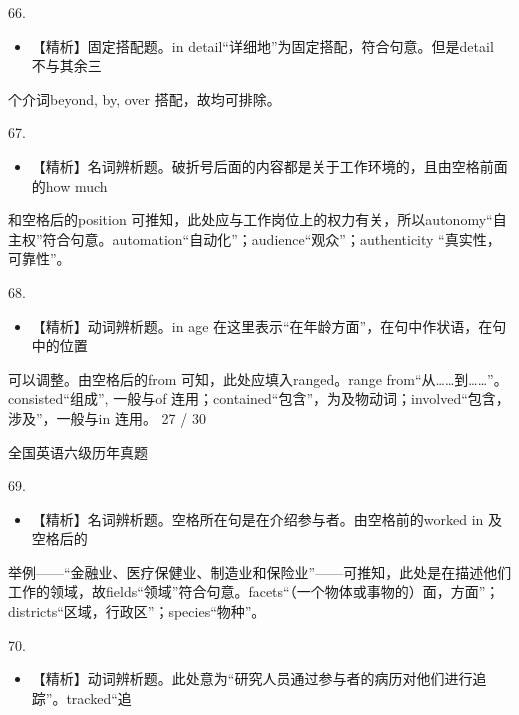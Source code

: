 \documentclass[UTF8,11pt]{ctexart}
\begin{document}
66.


\begin{itemize}[leftmargin=2em,itemsep=.2em,topsep=.4em]\item[B.] 【精析】固定搭配题。in detail“详细地”为固定搭配，符合句意。但是detail 不与其余三
\end{itemize}

个介词beyond, by, over 搭配，故均可排除。


67.


\begin{itemize}[leftmargin=2em,itemsep=.2em,topsep=.4em]\item[A.] 【精析】名词辨析题。破折号后面的内容都是关于工作环境的，且由空格前面的how much
\end{itemize}

和空格后的position 可推知，此处应与工作岗位上的权力有关，所以autonomy“自主权”符合句意。automation“自动化”；audience“观众”；authenticity “真实性，可靠性”。


68.


\begin{itemize}[leftmargin=2em,itemsep=.2em,topsep=.4em]\item[D.] 【精析】动词辨析题。in age 在这里表示“在年龄方面”，在句中作状语，在句中的位置
\end{itemize}

可以调整。由空格后的from 可知，此处应填入ranged。range from“从……到……”。consisted“组成”, 一般与of 连用；contained“包含”，为及物动词；involved“包含，涉及”，一般与in 连用。 27 / 30


全国英语六级历年真题


69.


\begin{itemize}[leftmargin=2em,itemsep=.2em,topsep=.4em]\item[B.] 【精析】名词辨析题。空格所在句是在介绍参与者。由空格前的worked in 及空格后的
\end{itemize}

举例——“金融业、医疗保健业、制造业和保险业”——可推知，此处是在描述他们工作的领域，故fields“领域”符合句意。facets“（一个物体或事物的）面，方面”；districts“区域，行政区”；species“物种”。


70.


\begin{itemize}[leftmargin=2em,itemsep=.2em,topsep=.4em]\item[C.] 【精析】动词辨析题。此处意为“研究人员通过参与者的病历对他们进行追踪”。tracked“追
\end{itemize}
\end{document}
